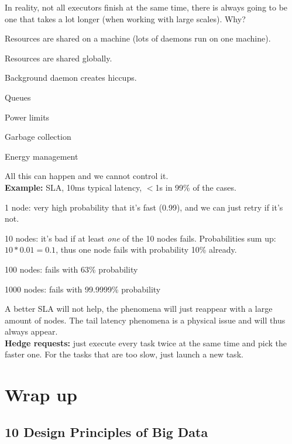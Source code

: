 \documentclass[11pt,oneside,a4paper]{article}
\begin{document}
{In reality, not all executors finish at the same time, there is always going to be one that takes a lot longer (when working with large scales). Why?

\begin{compactitem}
\item Resources are shared on a machine (lots of daemons run on one machine).
\item Resources are shared globally.
\item Background daemon creates hiccups.
\item Queues
\item Power limits
\item Garbage collection
\item Energy management 
\end{compactitem}

All this can happen and we cannot control it.\\

\textbf{Example:} SLA, 10ms typical latency, $<$1s in 99\% of the cases.

\begin{compactitem}
\item 1 node: very high probability that it's fast (0.99), and we can just retry if it's not.
\item 10 nodes: it's bad if at least \textit{one} of the 10 nodes fails. Probabilities sum up: $10*0.01 = 0.1$, thus one node fails with probability 10\% already.
\item 100 nodes: fails with 63\% probability
\item 1000 nodes: fails with 99.9999\% probability
\end{compactitem} 

A better SLA will not help, the phenomena will just reappear with a large amount of nodes. The tail latency phenomena is a physical issue and will thus always appear.\\

\textbf{Hedge requests:} just execute every task twice at the same time and pick the faster one. For the tasks that are too slow, just launch a new task.


\section{Wrap up}

\subsection{10 Design Principles of	Big Data}

}
\end{document}
